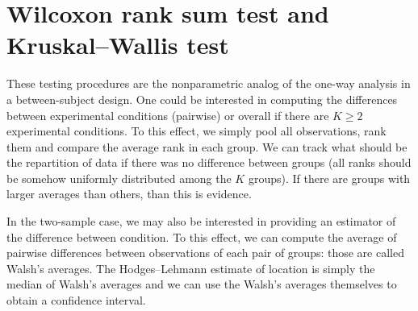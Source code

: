 \documentclass[
  11pt,
  letterpaper,
]{scrbook}
\theoremstyle{definition}
\theoremstyle{definition}
\theoremstyle{remark}
\begin{document}
\section{Wilcoxon rank sum test and Kruskal--Wallis
test}\label{wilcoxon-rank-sum-test-and-kruskalwallis-test}

These testing procedures are the nonparametric analog of the one-way
analysis in a between-subject design. One could be interested in
computing the differences between experimental conditions (pairwise) or
overall if there are \(K \geq 2\) experimental conditions. To this
effect, we simply pool all observations, rank them and compare the
average rank in each group. We can track what should be the repartition
of data if there was no difference between groups (all ranks should be
somehow uniformly distributed among the \(K\) groups). If there are
groups with larger averages than others, than this is evidence.

In the two-sample case, we may also be interested in providing an
estimator of the difference between condition. To this effect, we can
compute the average of pairwise differences between observations of each
pair of groups: those are called Walsh's averages. The Hodges--Lehmann
estimate of location is simply the median of Walsh's averages and we can
use the Walsh's averages themselves to obtain a confidence interval.
\end{document}
